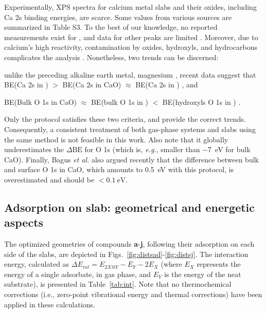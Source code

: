 \documentclass[%
aip,
amsmath,amssymb,
preprint,%
jcp,
showkeys,
]{revtex4-2}
\def\dbe{\ensuremath{\Delta\text{BE}}}
\begin{document}
Experimentally, XPS spectra for calcium metal slabs and their oxides, including Ca 2s binding energies, are scarce. Some values from various sources are summarized in Table S3. To the best of our knowledge, no reported measurements exist for , and data for other peaks are limited \cite{franzenXPSSpectraCrystalline1977,sveinbjornssonIonicConductivityFormation2014}. Moreover, due to calcium's high reactivity, contamination by oxides, hydroxyls, and hydrocarbons complicates the analysis \cite{dupinSystematicXPSStudies2000,bebenseeAdsorptionOxygenWater2008,fujimoriInteractionWaterCaO2016a,cristXPSLibraryWebsite2021a}. Nonetheless, two trends can be discerned: \begin{inparaenum}[(i)]
	\item unlike the preceding alkaline earth metal, magnesium \cite{dobrovolskyXPSStudyInfluence2017}, recent data suggest that BE(Ca 2s in ) $>$ BE(Ca 2s in CaO) $\approx$ BE(Ca 2s in ) \cite{ochsCO2ChemisorptionCa1998,cristHandbookMonochromaticXPS2000a,cristXPSLibraryWebsite2021a}, and 
	\item BE(Bulk O 1s in CaO) $\approx$ BE(bulk O 1s in ) $<$ BE(hydroxyls O 1s in ) \cite{dupinSystematicXPSStudies2000,bebenseeAdsorptionOxygenWater2008,fujimoriInteractionWaterCaO2016a,cristXPSLibraryWebsite2021a}.
\end{inparaenum}
Only the  protocol satisfies these two criteria, and provide the correct trends. Consequently, a consistent treatment of both gas-phase systems and slabs using the same method is not feasible in this work. Also note that it globally underestimates the \dbe{} for O 1s (which is, \textit{e.g.}, smaller than \SI{-7}{\electronvolt} for bulk CaO\cite{cristXPSLibraryWebsite2021a}). Finally, Bagus \emph{et al.}\cite{bagusRevisitingSurfaceCorelevel2019} also argued recently that the difference between bulk and surface O 1s in CaO, which amounts to \SI{0.5}{\electronvolt} with this protocol, is overestimated  and should be $<\SI{0.1}{\electronvolt}$.



\clearpage

\subsection{Adsorption on slab: geometrical and energetic aspects}\label{sec:geom}

The optimized geometries of compounds \textbf{a}-\textbf{j}, following their adsorption on each side of the slabs, are depicted in Figs.~\ref{fig:distsad}-\ref{fig:distsj}. The interaction energy, calculated as $\Delta E_{int} = E_{2X@Y} - E_Y - 2E_X$ (where $E_X$ represents the energy of a single adsorbate, in gas phase, and $E_Y$ is the energy of the neat substrate), is presented in Table~\ref{tab:int}. Note that no thermochemical corrections (i.e., zero-point vibrational energy and thermal corrections) have been applied in these calculations.
\end{document}
